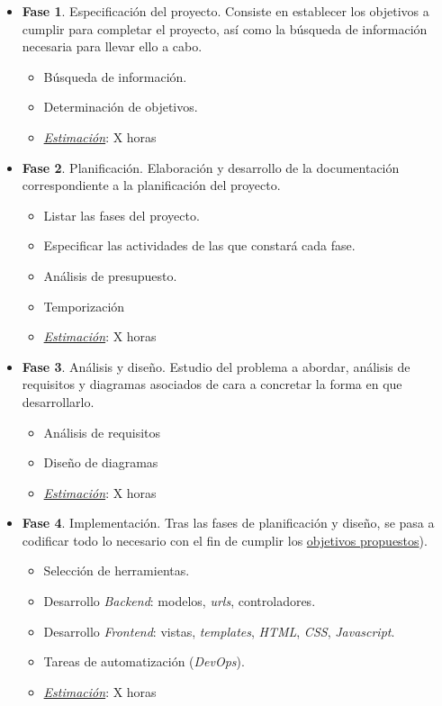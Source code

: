 \begin{itemize}
	\item \textbf{Fase 1}. Especificación del proyecto. Consiste en establecer los objetivos a cumplir para completar el proyecto, así como la búsqueda de información necesaria para llevar ello a cabo.
	\begin{itemize}
		\item Búsqueda de información.
		\item Determinación de objetivos.
		\item \underline{\textit{Estimación}}: X horas
	\end{itemize}
	
	\item \textbf{Fase 2}. Planificación. Elaboración y desarrollo de la documentación correspondiente a la planificación del proyecto.
	\begin{itemize}
		\item Listar las fases del proyecto.
		\item Especificar las actividades de las que constará cada fase.
		\item Análisis de presupuesto.
		\item Temporización
		\item \underline{\textit{Estimación}}: X horas
	\end{itemize}
	
	\item \textbf{Fase 3}. Análisis y diseño. Estudio del problema a abordar, análisis de requisitos y diagramas asociados de cara a concretar la forma en que desarrollarlo.
	\begin{itemize}
		\item Análisis de requisitos
		\item Diseño de diagramas
		\item \underline{\textit{Estimación}}: X horas
	\end{itemize}
	
	\item \textbf{Fase 4}. Implementación. Tras las fases de planificación y diseño, se pasa a codificar todo lo necesario con el fin de cumplir los \hyperref[cap:objetivos]{objetivos propuestos}).
	\begin{itemize}
		\item Selección de herramientas.
		\item Desarrollo \textit{Backend}: modelos, \textit{urls}, controladores.
		\item Desarrollo \textit{Frontend}: vistas, \textit{templates}, \textit{HTML}, \textit{CSS}, \textit{Javascript}.
		\item Tareas de automatización (\textit{DevOps}).
		\item \underline{\textit{Estimación}}: X horas
	\end{itemize}
	

\end{itemize}
